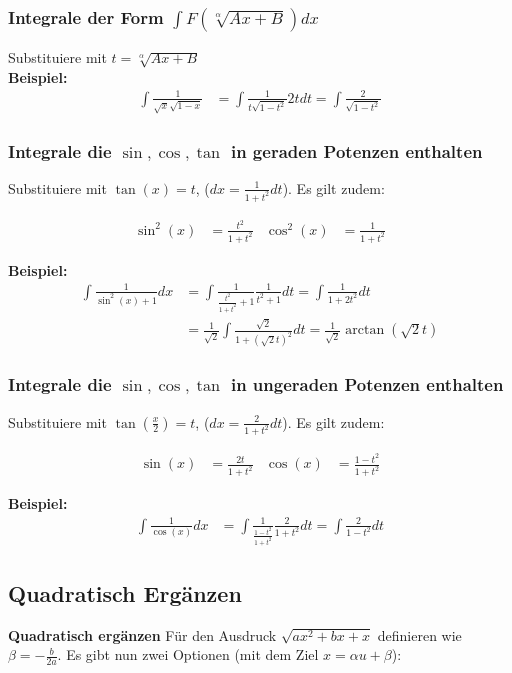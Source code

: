 \documentclass[25pt]{sciposter}
\newenvironment{method}[1]{\begin{mdframed}[backgroundcolor=blue!10,innertopmargin=15pt, innerbottommargin=15pt, nobreak=true]
		\textbf{#1 }
	}
	{ 
	\end{mdframed}
}
\begin{document}
\begin{multicols}{3}
\subsubsection*{Integrale der Form $\int F(\sqrt[\alpha]{Ax + B}) dx$}
Substituiere mit $t = \sqrt[\alpha]{Ax + B}$\\
\textbf{Beispiel:}
\begin{align*}
	\int \frac{1}{\sqrt{x} \sqrt{1-x}} &= \int \frac{1}{t \sqrt{1-t^2}} 2t dt = \int \frac{2}{\sqrt{1-t^2}}
\end{align*}

\subsubsection*{Integrale die $\sin, \cos, \tan$ in geraden Potenzen enthalten}
Substituiere mit $\tan(x) = t$, ($dx = \frac{1}{1+t^2} dt$). Es gilt zudem:

\begin{align*}
\sin^2(x) &= \frac{t^2}{1+t^2} & \cos^2(x) &= \frac{1}{1+t^2}
\end{align*}

\textbf{Beispiel:}
\begin{align*}
	\int \frac{1}{\sin^2(x) + 1} dx &= \int \frac{1}{\frac{t^2}{1+t^2} + 1} \frac{1}{t^2 + 1} dt = \int \frac{1}{1+2t^2} dt\\ &= \frac{1}{\sqrt{2}} \int  \frac{\sqrt{2}}{1 + (\sqrt{2}t)^2} dt = \frac{1}{\sqrt{2}} \arctan(\sqrt{2}t)
\end{align*}


\subsubsection*{Integrale die $\sin, \cos, \tan$ in ungeraden Potenzen enthalten}
Substituiere mit $\tan(\frac{x}{2}) = t$, ($dx = \frac{2}{1+t^2} dt$). Es gilt zudem:

\begin{align*}
\sin(x) &= \frac{2t}{1+t^2} & \cos(x) &= \frac{1-t^2}{1+t^2}
\end{align*}

\textbf{Beispiel:}
\begin{align*}
	\int \frac{1}{\cos(x)} dx &= \int \frac{1}{\frac{1-t^2}{1+t^2}} \frac{2}{1+t^2} dt = \int \frac{2}{1-t^2} dt
\end{align*}

\subsection*{Quadratisch Ergänzen}
\begin{method}{Quadratisch ergänzen} Für den Ausdruck $\sqrt{ax^2 + bx + x}$ definieren wie $\beta = - \frac{b}{2a}$. Es gibt nun zwei Optionen (mit dem Ziel $x= \alpha u + \beta$):


\end{method}
\end{multicols}
\end{document}
